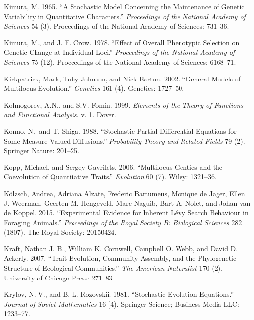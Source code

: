 \documentclass[]{article}
\begin{document}
\leavevmode\hypertarget{ref-Kimura1965}{}%
Kimura, M. 1965. ``A Stochastic Model Concerning the Maintenance of
Genetic Variability in Quantitative Characters.'' \emph{Proceedings of
the National Academy of Sciences} 54 (3). Proceedings of the National
Academy of Sciences: 731--36.

\leavevmode\hypertarget{ref-Kimura1978}{}%
Kimura, M., and J. F. Crow. 1978. ``Effect of Overall Phenotypic
Selection on Genetic Change at Individual Loci.'' \emph{Proceedings of
the National Academy of Sciences} 75 (12). Proceedings of the National
Academy of Sciences: 6168--71.

\leavevmode\hypertarget{ref-Kirkpatrick1727}{}%
Kirkpatrick, Mark, Toby Johnson, and Nick Barton. 2002. ``General Models
of Multilocus Evolution.'' \emph{Genetics} 161 (4). Genetics: 1727--50.

\leavevmode\hypertarget{ref-kolmogorov1999elements}{}%
Kolmogorov, A.N., and S.V. Fomin. 1999. \emph{Elements of the Theory of
Functions and Functional Analysis}. v. 1. Dover.

\leavevmode\hypertarget{ref-Konno1988}{}%
Konno, N., and T. Shiga. 1988. ``Stochastic Partial Differential
Equations for Some Measure-Valued Diffusions.'' \emph{Probability Theory
and Related Fields} 79 (2). Springer Nature: 201--25.

\leavevmode\hypertarget{ref-Kopp2006}{}%
Kopp, Michael, and Sergey Gavrilets. 2006. ``Multilocus Gentics and the
Coevolution of Quantitative Traits.'' \emph{Evolution} 60 (7). Wiley:
1321--36.

\leavevmode\hypertarget{ref-Klzsch2015}{}%
Kölzsch, Andrea, Adriana Alzate, Frederic Bartumeus, Monique de Jager,
Ellen J. Weerman, Geerten M. Hengeveld, Marc Naguib, Bart A. Nolet, and
Johan van de Koppel. 2015. ``Experimental Evidence for Inherent Lévy
Search Behaviour in Foraging Animals.'' \emph{Proceedings of the Royal
Society B: Biological Sciences} 282 (1807). The Royal Society: 20150424.

\leavevmode\hypertarget{ref-Kraft2007}{}%
Kraft, Nathan J. B., William K. Cornwell, Campbell O. Webb, and David D.
Ackerly. 2007. ``Trait Evolution, Community Assembly, and the
Phylogenetic Structure of Ecological Communities.'' \emph{The American
Naturalist} 170 (2). University of Chicago Press: 271--83.

\leavevmode\hypertarget{ref-Krylov1981}{}%
Krylov, N. V., and B. L. Rozovskii. 1981. ``Stochastic Evolution
Equations.'' \emph{Journal of Soviet Mathematics} 16 (4). Springer
Science; Business Media LLC: 1233--77.
\end{document}
